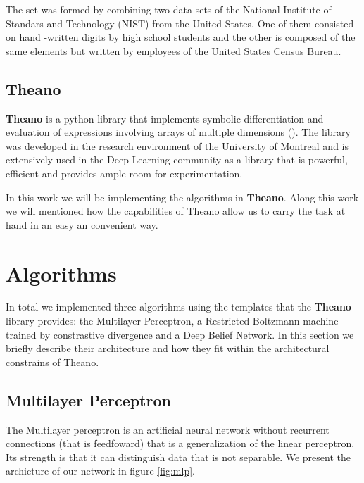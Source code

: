 \documentclass[11pt,a4paper]{article}
\begin{document}
The set was formed by combining two data sets of the National Institute of Standars and Technology (NIST) from the United States. One of them consisted on hand 
-written digits by high school students and the other is composed of the same elements but written by employees of the United States Census Bureau. 

\subsection{Theano}
\textbf{Theano} is a python library that implements symbolic differentiation and evaluation of expressions involving arrays of multiple dimensions (\cite{bergstra2010theano}). The library was developed in the research environment of the University of Montreal and is extensively used in the Deep Learning community as a library that is powerful, efficient and provides ample room for experimentation. 

In this work we will be implementing the algorithms in \textbf{Theano}. Along this work we will mentioned how the capabilities of Theano allow us to carry the task at hand in an easy an convenient way. 

\section{Algorithms}

In total we implemented three algorithms using the templates that the \textbf{Theano} library provides: the Multilayer Perceptron, a Restricted Boltzmann machine trained by constrastive divergence and a Deep Belief Network. In this section we briefly describe their architecture and how they fit within the architectural constrains of Theano.

\subsection{Multilayer Perceptron}

The Multilayer perceptron is an artificial neural network without recurrent connections (that is feedfoward) that is a generalization of the linear perceptron. Its strength is that it can distinguish data that is not separable. We present the archicture of our network in figure \ref{fig:mlp}. 
\end{document}
